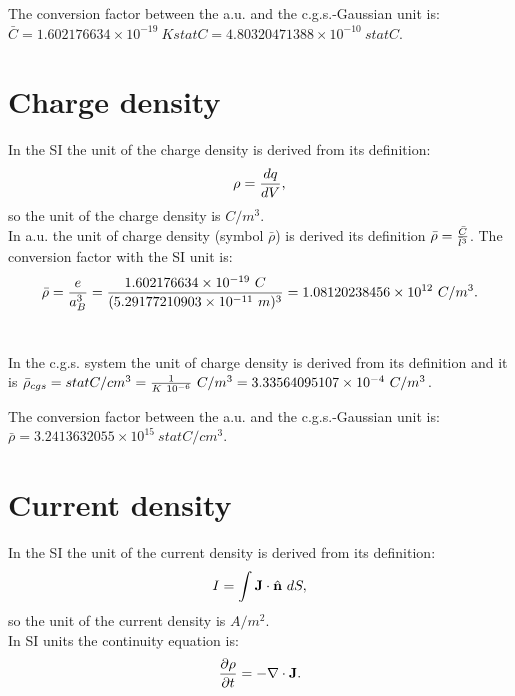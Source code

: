 \documentclass[12pt,a4paper]{article}
\def\barl{5.29177210903\times 10^{-11}}
\def\barc{1.602176634\times 10^{-19}}
\def\barrho{1.08120238456\times 10^{12}}
\def\rhotorho{3.33564095107\times 10^{-4}}
\def\barccgs{4.80320471388\times 10^{-10}}
\def\barrhocgs{3.2413632055\times 10^{15}}
\begin{document}

{\color{green} The conversion factor between the a.u. and the 
c.g.s.-Gaussian unit is: $\bar C=\barc\ K statC=\barccgs\ statC$. \\
}

\newpage
\section{\color{coral}Charge density}
In the SI the unit of the charge density is derived from its
definition:
\begin{equation}
\rho={dq \over dV},
\end{equation}
so the unit of the charge density is $C/m^3$.
\\

{\color{web-blue} In a.u. the unit of charge density (symbol $\bar \rho$) 
is derived its definition $\bar \rho ={\bar C \over \bar l^3}$. The
conversion factor with the SI unit is: 
\begin{equation}
\bar \rho = {e\over a_B^3} =
{\barc\ C\over (\barl\ m)^3}=\barrho\ C/m^3. 
\end{equation}
\\
}

{\color{orange} In the c.g.s. system the unit of charge density  
is derived from its definition and it is
$\bar \rho_{cgs}=statC/cm^3 = {1 \over K\ 10^{-6}}\ C/m^3=\rhotorho\ C/m^3$.
\\
}

{\color{green} The conversion factor between the a.u. and the 
c.g.s.-Gaussian unit is: $\bar \rho = \barrhocgs\ statC/cm^3$. 
\\
}

\newpage
\section{\color{coral}Current density}
In the SI the unit of the current density is derived from 
its definition:
\begin{equation}
I=\int {\bf J}\cdot \hat {\bf n}\ dS,
\end{equation}
so the unit of the current density is $A/m^2$.
\\
In SI units the continuity equation is:
\begin{equation}
{\partial \rho \over \partial t}=-\nabla \cdot {\bf J}.
\label{continuitysi}
\end{equation}
\\
\end{document}
